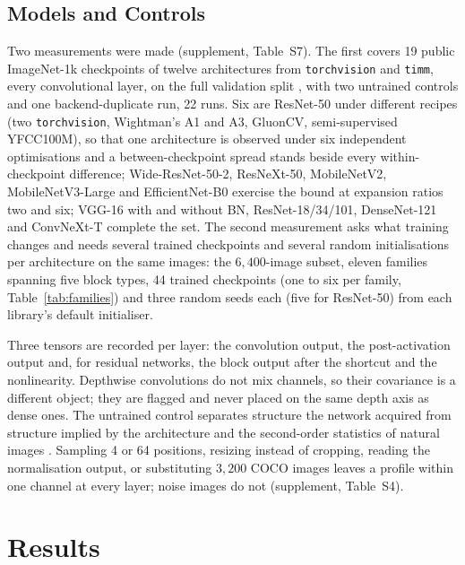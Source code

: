 \documentclass[10pt,journal,compsoc]{IEEEtran}
\begin{document}
\subsection{Models and Controls}
\label{sec:models}


Two measurements were made (supplement, Table~S7). The first covers 19
public ImageNet-1k checkpoints of twelve architectures from
\texttt{torchvision} and \texttt{timm}, every convolutional layer, on the
full validation split \cite{deng2009imagenet}, with two untrained controls
and one backend-duplicate run, 22 runs. Six are ResNet-50
\cite{he2016resnet} under different recipes (two \texttt{torchvision},
Wightman's A1 and A3, GluonCV, semi-supervised YFCC100M), so that one
architecture is observed under six independent optimisations and a
between-checkpoint spread stands beside every within-checkpoint
difference; Wide-ResNet-50-2, ResNeXt-50, MobileNetV2, MobileNetV3-Large
and EfficientNet-B0 exercise the bound at expansion ratios two and six;
VGG-16 with and without BN, ResNet-18/34/101, DenseNet-121 and ConvNeXt-T
complete the set. The second measurement asks what training changes and
needs several trained checkpoints and several random initialisations per
architecture on the same images: the $6{,}400$-image subset, eleven
families spanning five block types, 44 trained checkpoints (one to six
per family, Table~\ref{tab:families}) and three random seeds each (five
for ResNet-50) from each library's default initialiser.

Three tensors are recorded per layer: the convolution output, the
post-activation output and, for residual networks, the block output after
the shortcut and the nonlinearity. Depthwise convolutions do not mix
channels, so their covariance is a different object; they are flagged and
never placed on the same depth axis as dense ones. The untrained control
separates structure the network acquired from structure implied by the
architecture and the second-order statistics of natural images
\cite{field1987relations}. Sampling 4 or 64 positions, resizing instead
of cropping, reading the normalisation output, or substituting $3{,}200$
COCO images leaves a profile within one channel at every layer; noise
images do not (supplement, Table~S4).

\section{Results}
\label{sec:results}
\end{document}
